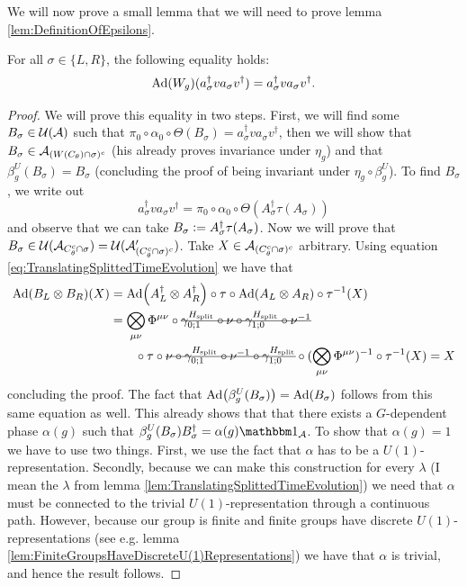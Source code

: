 \documentclass[11pt,a4paper,twoside]{article}
\numberwithin{equation}{section}
\begin{document}
	We will now prove a small lemma that we will need to prove lemma \ref{lem:DefinitionOfEpsilons}.
	\begin{lemma}\label{lem:EqualityTwoTranslationsUsingConnectedPath}
		For all $\sigma\in\{L,R\}$, the following equality holds:
		\begin{equation}
			\Ad{W_g}(a_\sigma^\dagger v a_\sigma v^\dagger)=a_\sigma^\dagger v a_\sigma v^\dagger.
		\end{equation}
	\end{lemma}
	\begin{proof}
		We will prove this equality in two steps. First, we will find some $B_\sigma\in\UU(\AA)$ such that $\pi_0\circ\alpha_0\circ\Theta(B_\sigma)=a_\sigma^\dagger v a_\sigma v^\dagger$, then we will show that $B_\sigma\in\AA_{(W(C_\theta)\cap\sigma)^c}$ (his already proves invariance under $\eta_g$) and that $\beta_g^{U}(B_\sigma)=B_\sigma$ (concluding the proof of being invariant under $\eta_g\circ\beta_g^U$). To find $B_\sigma$, we write out                                                                                                                                                                                                              
		\begin{equation}
			a_\sigma^\dagger v a_\sigma v^\dagger=\pi_0\circ\alpha_0\circ\Theta(A_\sigma^\dagger\tau(A_\sigma))
		\end{equation}
		and observe that we can take $B_\sigma \defeq A_\sigma^\dagger\tau(A_\sigma)$. Now we will prove that $B_\sigma\in\UU(\AA_{C_\theta^c\cap\sigma})=\UU(\AA_{(C_\theta^c\cap\sigma)^c}')$. Take $X\in\AA_{(C_\theta^c\cap\sigma)^c}$ arbitrary. Using equation \eqref{eq:TranslatingSplittedTimeEvolution} we have that
		\begin{align}
			\Ad{B_L\otimes B_R}(X)&=\Ad{A_L^\dagger\otimes A_R^\dagger}\circ\tau\circ\Ad{A_L\otimes A_R}\circ\tau^{-1}(X)\\
			&=\bigotimes_{\mu\nu}\Phi^{\mu\nu}\circ\stkout{\gamma^{\Hsplit}_{0;1}\circ\nu\circ \gamma^{\Hsplit}_{1;0}\circ\nu^{-1}}\\
			\nonumber
			&\qquad\circ\tau\circ\stkout{\nu\circ\gamma^{\Hsplit}_{0;1}\circ\nu^{-1}\circ\gamma^{\Hsplit}_{1;0}}\circ(\bigotimes_{\mu\nu}\Phi^{\mu\nu})^{-1}\circ\tau^{-1}(X)=X
		\end{align}
		concluding the proof. The fact that $\Ad{\beta_g^{U}(B_\sigma)}=\Ad{B_\sigma}$ follows from this same equation as well. This already shows that that there exists a $G$-dependent phase $\alpha(g)$ such that $\beta_g^{U}(B_\sigma)B_\sigma^\dagger=\alpha(g)\id_\AA$. To show that $\alpha(g)=1$ we have to use two things. First, we use the fact that $\alpha$ has to be a $U(1)$-representation. Secondly, because we can make this construction for every $\lambda$ (I mean the $\lambda$ from lemma \ref{lem:TranslatingSplittedTimeEvolution}) we need that $\alpha$ must be connected to the trivial $U(1)$-representation through a continuous path. However, because our group is finite and finite groups have discrete $U(1)$-representations (see e.g. lemma \ref{lem:FiniteGroupsHaveDiscreteU(1)Representations}) we have that $\alpha$ is trivial, and hence the result follows.
	\end{proof}
\end{document}
